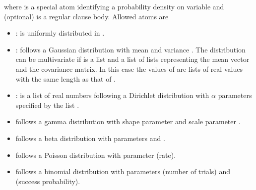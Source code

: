 \documentclass[letterpaper,10pt,english]{sphinxmanual}
\begin{document}
\sphinxAtStartPar
where  is a special atom identifying a probability density on variable  and 
(optional) is a regular clause body. Allowed  atoms are
\begin{itemize}
\item {} 
\sphinxAtStartPar
{}:  is uniformly distributed in \sphinxcode{\sphinxupquote{{[}L,U{]}}}.

\item {} 
\sphinxAtStartPar
{}:  follows a Gaussian distribution with mean  and variance . The distribution can be multivariate if  is a list and  a list of lists representing the mean vector and the covariance matrix. In this case the values of  are lists of real values with the same length as that of .

\item {} 
\sphinxAtStartPar
{}:  is a list of real numbers following a Dirichlet distribution with \(\alpha\) parameters specified by the list .

\item {} 
\sphinxAtStartPar
{}  follows a gamma distribution with shape parameter  and scale parameter .

\item {} 
\sphinxAtStartPar
{}  follows a beta distribution with parameters  and .

\item {} 
\sphinxAtStartPar
{}  follows a Poisson distribution with parameter  (rate).

\item {} 
\sphinxAtStartPar
{}  follows a binomial distribution with parameters  (number of trials) and  (success probability).


\end{itemize}
\end{document}
